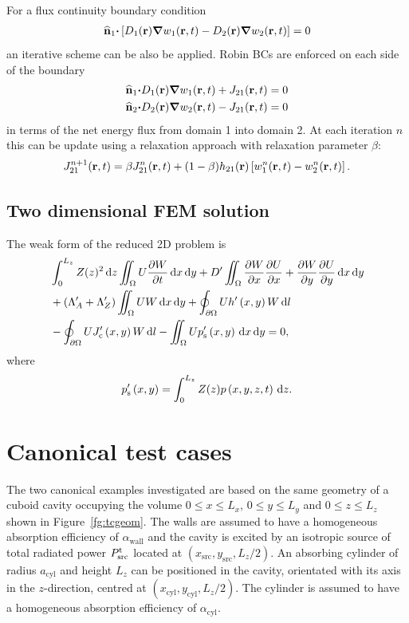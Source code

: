 \documentclass[a4paper]{article}
\numberwithin{equation}{section}
\newcounter{Figure}
\begin{document}
For a flux continuity boundary condition
\begin{align}
\widehat{\boldsymbol{\mathrm{n}}}_1{\boldsymbol{\mathrm{\cdot}}}\left[D_1(\boldsymbol{\mathrm{r}}){\boldsymbol{\mathrm{\nabla}}}w_1(\boldsymbol{\mathrm{r}},t)-D_2(\boldsymbol{\mathrm{r}}){\boldsymbol{\mathrm{\nabla}}}w_2(\boldsymbol{\mathrm{r}},t)\right]=0
\end{align}
an iterative scheme can be also be applied. Robin BCs are enforced on each side
of the boundary 
\begin{align}
\widehat{\boldsymbol{\mathrm{n}}}_1{\boldsymbol{\mathrm{\cdot}}}D_1(\boldsymbol{\mathrm{r}}){\boldsymbol{\mathrm{\nabla}}}w_1(\boldsymbol{\mathrm{r}},t)+J_{21}(\boldsymbol{\mathrm{r}},t) &=0 \\
\widehat{\boldsymbol{\mathrm{n}}}_2{\boldsymbol{\mathrm{\cdot}}}D_2(\boldsymbol{\mathrm{r}}){\boldsymbol{\mathrm{\nabla}}}w_2(\boldsymbol{\mathrm{r}},t)-J_{21}(\boldsymbol{\mathrm{r}},t) &=0
\end{align}
in terms of the net energy flux from domain 1 into domain 2. At each iteration $n$ this can be
update using a relaxation approach with relaxation parameter $\beta$:
\begin{align}
J^{n+1}_{21}(\boldsymbol{\mathrm{r}},t) = \beta J^n_{21}(\boldsymbol{\mathrm{r}},t) + ( 1 - \beta) h_{21}(\boldsymbol{\mathrm{r}}) \left[ w^n_1(\boldsymbol{\mathrm{r}},t) - w^n_2(\boldsymbol{\mathrm{r}},t) \right].
\end{align}

\subsection[Two dimensional FEM solution]{Two dimensional FEM solution}
\label{sc:fem:2d}

The weak form of the reduced 2D problem is
\begin{align}
&\int_0^{L_z}Z(z)^2\,\mathrm{d}{z}\iint_{\Omega} U\frac{{\partial}W}{{\partial}t}\,\mathrm{d}{x}\,\mathrm{d}{y}
+D^\prime\iint_{\Omega}\frac{{\partial}W}{{\partial}x}\frac{{\partial}U}{{\partial}x}+\frac{{\partial}W}{{\partial}y}\frac{{\partial}U}{{\partial}y}\,\mathrm{d}{x}\,\mathrm{d}{y} \nonumber \\
&+\left(\Lambda_A^\prime+\Lambda _Z^\prime\right)\iint_{\Omega }UW\,\mathrm{d}{x}\,\mathrm{d}{y}
+\oint_{\partial\Omega} Uh^\prime\left(x,y\right)W\,\mathrm{d}{l} \nonumber \\
&-\oint_{\partial\Omega} UJ_{\mathrm{c}}^\prime\left(x,y\right) W\,\mathrm{d}{l}
-\iint_{\Omega} U p_{\mathrm{s}}^\prime\left(x,y\right)\,\mathrm{d}{x}\,\mathrm{d}{y}=0,
\end{align}
where
\begin{align}
p_{\mathrm{s}}^\prime\left(x,y\right)=\int_0^{L_z}Z(z)p\left(x,y,z,t\right)\,\mathrm{d}{z}.
\end{align}

\section[Canonical test cases]{Canonical test cases}
\label{sc:tcs}

The two canonical examples investigated are based on the same geometry of a
cuboid cavity occupying the volume $0 \leq x \leq L_x$, $0 \leq y \leq L_y$ and 
$0 \leq z \leq L_z$ shown in Figure~\ref{fg:tcgeom}. The walls are assumed to have 
a homogeneous absorption efficiency of $\alpha_\mathrm{wall}$ and the cavity is excited
by an isotropic source of total radiated power $P^{\mathrm{t}}_\mathrm{src}$ located at 
$(x_\mathrm{src},y_\mathrm{src},L_z/2)$. An absorbing cylinder of radius $a_\mathrm{cyl}$ 
and height $L_z$ can be positioned in the cavity, orientated with its axis in the
$z$-direction, centred at $(x_\mathrm{cyl},y_\mathrm{cyl},L_z/2)$. The cylinder is assumed
to have a homogeneous absorption efficiency of $\alpha_\mathrm{cyl}$.
\end{document}
